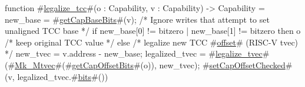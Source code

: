 function #\hyperref[sailRISCVzlegalizzezytcc]{legalize\_tcc}#(o : Capability, v : Capability) -> Capability = {
  new_base = #\hyperref[sailRISCVzgetCapBaseBits]{getCapBaseBits}#(v);
  /* Ignore writes that attempt to set unaligned TCC base */
  if new_base[0] != bitzero | new_base[1] != bitzero then
    o /* keep original TCC value */
  else {
    /* legalize new TCC #\hyperref[sailRISCVzoffset]{offset}# (RISC-V tvec) */
    new_tvec = v.address - new_base;
    legalized_tvec = #\hyperref[sailRISCVzlegalizzezytvec]{legalize\_tvec}#(#\hyperref[sailRISCVzMkzyMtvec]{Mk\_Mtvec}#(#\hyperref[sailRISCVzgetCapOffsetBits]{getCapOffsetBits}#(o)), new_tvec);
    #\hyperref[sailRISCVzsetCapOffsetChecked]{setCapOffsetChecked}#(v, legalized_tvec.#\hyperref[sailRISCVzbits]{bits}#())
  }
}
